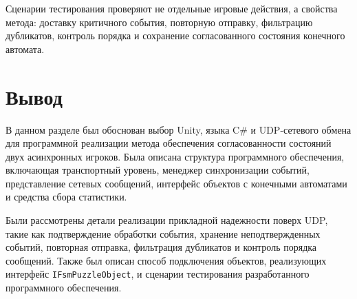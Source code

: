 Сценарии тестирования проверяют не отдельные игровые действия, а свойства метода: доставку критичного события, повторную отправку, фильтрацию дубликатов, контроль порядка и сохранение согласованного состояния конечного автомата.

\section*{Вывод}

В данном разделе был обоснован выбор Unity, языка C\# и UDP-сетевого обмена для программной реализации метода обеспечения согласованности состояний двух асинхронных игроков. Была описана структура программного обеспечения, включающая транспортный уровень, менеджер синхронизации событий, представление сетевых сообщений, интерфейс объектов с конечными автоматами и средства сбора статистики.

Были рассмотрены детали реализации прикладной надежности поверх UDP, такие как подтверждение обработки события, хранение неподтвержденных событий, повторная отправка, фильтрация дубликатов и контроль порядка сообщений. 
Также был описан способ подключения объектов, реализующих интерфейс \texttt{IFsmPuzzleObject}, и сценарии тестирования разработанного программного обеспечения.
